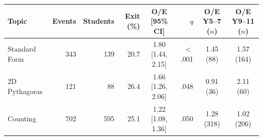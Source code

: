 \begin{tabular}{@{}lrrrcrcc@{}}\toprule
Topic & Events & Students & Exit (\%) & O/E [95\% CI] & $q$ & O/E Y5--7 ($n$) & O/E Y9--11 ($n$) \\\midrule
Standard Form & 343 & 139 & 20.7 & 1.80 [1.44, 2.15] & $<$.001 & 1.45 (88) & 1.57 (164) \\
2D Pythagoras & 121 & 88 & 26.4 & 1.66 [1.26, 2.06] & .048 & 0.91 (36) & 2.11 (60) \\
Counting & 702 & 595 & 25.1 & 1.22 [1.08, 1.36] & .050 & 1.28 (318) & 1.02 (206) \\
\bottomrule\end{tabular}
